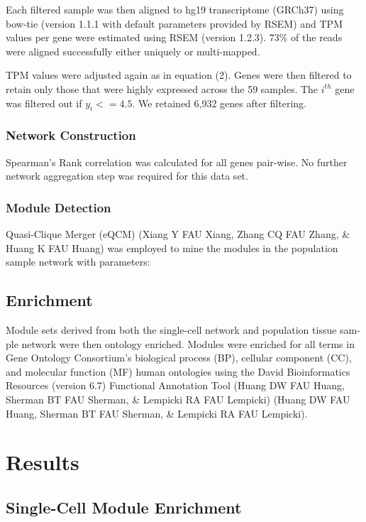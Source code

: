 \documentclass[11pt,twoside,a4paper]{article}
\begin{document}
Each filtered sample was then aligned to hg19 transcriptome (GRCh37) using bow-tie (version 1.1.1 with default parameters provided by RSEM) and TPM values per gene were estimated using RSEM (version 1.2.3). 73\% of the reads were aligned successfully either uniquely or multi-mapped. 

TPM values were adjusted again as in equation (2). Genes were then filtered to retain only those that were highly expressed across the 59 samples. The $i^{th}$ gene was filtered out if $y_{i} <= 4.5$. We retained 6,932 genes after filtering.
\subsubsection{Network Construction}

Spearman’s Rank correlation was calculated for all genes pair-wise. No further network aggregation step was required for this data set. 

\subsubsection{Module Detection}

Quasi-Clique Merger (eQCM) (Xiang Y FAU Xiang, Zhang CQ FAU Zhang, \& Huang K FAU Huang) was employed to mine the modules in the population sample network with parameters:

\subsection{Enrichment}

Module sets derived from both the single-cell network and population tissue sam-ple network were then ontology enriched. Modules were enriched for all terms in Gene Ontology Consortium’s biological process (BP), cellular component (CC), and molecular function (MF) human ontologies using the David Bioinformatics Resources (version 6.7) Functional Annotation Tool (Huang DW FAU Huang, Sherman BT FAU Sherman, \& Lempicki RA FAU Lempicki) (Huang DW FAU Huang, Sherman BT FAU Sherman, \& Lempicki RA FAU Lempicki).

\section{Results}
\subsection{Single-Cell Module Enrichment}
\end{document}
